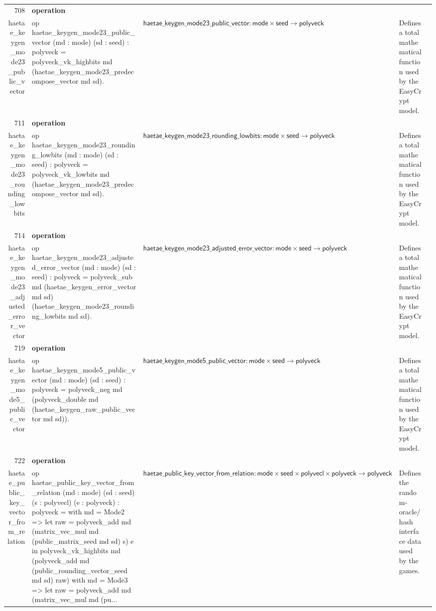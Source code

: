 \documentclass[10pt]{article}
\newcommand{\ec}[1]{\begingroup\ttfamily\scriptsize #1\endgroup}
\begin{document}
\begin{longtable}{r L{0.17\textwidth} L{0.26\textwidth} L{0.27\textwidth} L{0.20\textwidth}}
708 & \textbf{operation}\\\ec{haetae\_keygen\_mode23\_public\_vector} & \ec{op haetae\_keygen\_mode23\_public\_vector (md : mode) (sd : seed) : polyveck = polyveck\_vk\_highbits md (haetae\_keygen\_mode23\_predecompose\_vector md sd).} & \(\mathsf{haetae\_keygen\_mode23\_public\_vector} : \mathsf{mode} \times \mathsf{seed} \to \mathsf{polyveck}\) & Defines a total mathematical function used by the EasyCrypt model. \\
711 & \textbf{operation}\\\ec{haetae\_keygen\_mode23\_rounding\_lowbits} & \ec{op haetae\_keygen\_mode23\_rounding\_lowbits (md : mode) (sd : seed) : polyveck = polyveck\_vk\_lowbits md (haetae\_keygen\_mode23\_predecompose\_vector md sd).} & \(\mathsf{haetae\_keygen\_mode23\_rounding\_lowbits} : \mathsf{mode} \times \mathsf{seed} \to \mathsf{polyveck}\) & Defines a total mathematical function used by the EasyCrypt model. \\
714 & \textbf{operation}\\\ec{haetae\_keygen\_mode23\_adjusted\_error\_vector} & \ec{op haetae\_keygen\_mode23\_adjusted\_error\_vector (md : mode) (sd : seed) : polyveck = polyveck\_sub md (haetae\_keygen\_error\_vector md sd) (haetae\_keygen\_mode23\_rounding\_lowbits md sd).} & \(\mathsf{haetae\_keygen\_mode23\_adjusted\_error\_vector} : \mathsf{mode} \times \mathsf{seed} \to \mathsf{polyveck}\) & Defines a total mathematical function used by the EasyCrypt model. \\
719 & \textbf{operation}\\\ec{haetae\_keygen\_mode5\_public\_vector} & \ec{op haetae\_keygen\_mode5\_public\_vector (md : mode) (sd : seed) : polyveck = polyveck\_neg md (polyveck\_double md (haetae\_keygen\_raw\_public\_vector md sd)).} & \(\mathsf{haetae\_keygen\_mode5\_public\_vector} : \mathsf{mode} \times \mathsf{seed} \to \mathsf{polyveck}\) & Defines a total mathematical function used by the EasyCrypt model. \\
722 & \textbf{operation}\\\ec{haetae\_public\_key\_vector\_from\_relation} & \ec{op haetae\_public\_key\_vector\_from\_relation (md : mode) (sd : seed) (s : polyvecl) (e : polyveck) : polyveck = with md = Mode2 => let raw = polyveck\_add md (matrix\_vec\_mul md (public\_matrix\_seed md sd) s) e in polyveck\_vk\_highbits md (polyveck\_add md (public\_rounding\_vector\_seed md sd) raw) with md = Mode3 => let raw = polyveck\_add md (matrix\_vec\_mul md (pu...} & \(\mathsf{haetae\_public\_key\_vector\_from\_relation} : \mathsf{mode} \times \mathsf{seed} \times \mathsf{polyvecl} \times \mathsf{polyveck} \to \mathsf{polyveck}\) & Defines the random-oracle/hash interface data used by the games. \\

\end{longtable}
\end{document}
